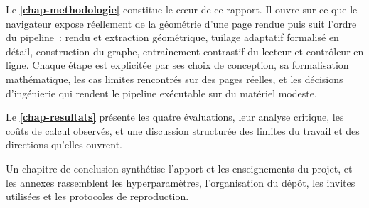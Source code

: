 Le \textbf{\cref{chap-methodologie}} constitue le cœur de ce rapport. Il ouvre
sur ce que le navigateur expose réellement de la géométrie d'une page rendue puis
suit l'ordre du pipeline~: rendu et extraction géométrique, tuilage adaptatif
formalisé en détail, construction du graphe, entraînement contrastif du
lecteur et contrôleur en ligne. Chaque étape est explicitée par ses choix de
conception, sa formalisation mathématique, les cas limites rencontrés sur des
pages réelles, et les décisions d'ingénierie qui rendent le pipeline exécutable
sur du matériel modeste.

Le \textbf{\cref{chap-resultats}} présente les quatre évaluations, leur
analyse critique, les coûts de calcul observés, et une discussion structurée des
limites du travail et des directions qu'elles ouvrent.

Un chapitre de conclusion synthétise l'apport et les enseignements du projet,
et les annexes rassemblent les hyperparamètres, l'organisation du dépôt, les
invites utilisées et les protocoles de reproduction.
